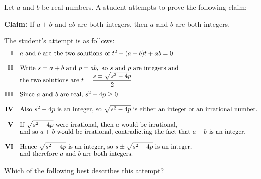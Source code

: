 \documentclass[11pt,a4paper]{article}
\begin{document}
\begin{enumerate}[label=\textbf{\arabic*.},leftmargin=*,itemsep=0pt,start=6]
Let $a$ and $b$ be real numbers. A student attempts to prove the following claim: 
\begin{center} \begin{minipage}{0.82\linewidth} \centering \textbf{Claim:} If $a+b$ and $ab$ are both integers, then $a$ and $b$ are both integers. \end{minipage} \end{center}

The student's attempt is as follows:\[
\begin{array}{@{}rl@{}}
\textbf{I} &
\text{$a$ and $b$ are the two solutions of }
t^2-(a+b)t+ab=0 \\[10pt]

\textbf{II} &
\text{Write }s=a+b\text{ and }p=ab,\text{ so }s\text{ and }p\text{ are integers and} \\[-1pt]
&
\displaystyle
\text{the two solutions are }
t=\frac{s\pm\sqrt{s^2-4p}}{2} \\[10pt]

\textbf{III} &
\text{Since }a\text{ and }b\text{ are real, }s^2-4p\geq0 \\[10pt]

\textbf{IV} &
\text{Also }s^2-4p\text{ is an integer, so }\sqrt{s^2-4p}
\text{ is either an integer or an irrational number.} \\[10pt]

\textbf{V} &
\text{If }\sqrt{s^2-4p}\text{ were irrational, then }a\text{ would be irrational,} \\[-1pt]
&
\text{and so }a+b\text{ would be irrational, contradicting the fact that }
a+b\text{ is an integer.} \\[10pt]

\textbf{VI} &
\text{Hence }\sqrt{s^2-4p}\text{ is an integer, so }
s\pm\sqrt{s^2-4p}\text{ is an integer,} \\[-1pt]
&
\text{and therefore }a\text{ and }b\text{ are both integers.}
\end{array}
\]

Which of the following best describes this attempt?


\end{enumerate}
\end{document}
